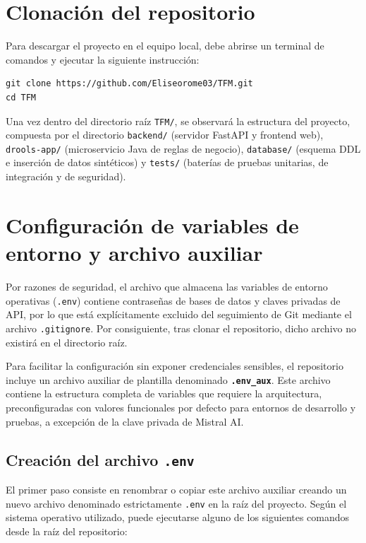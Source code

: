 \section{Clonación del repositorio}

Para descargar el proyecto en el equipo local, debe abrirse un terminal de comandos y ejecutar la siguiente instrucción:

\begin{verbatim}
git clone https://github.com/Eliseorome03/TFM.git
cd TFM
\end{verbatim}

Una vez dentro del directorio raíz \texttt{TFM/}, se observará la estructura del proyecto, compuesta por el directorio \texttt{backend/} (servidor FastAPI y frontend web), \texttt{drools-app/} (microservicio Java de reglas de negocio), \texttt{database/} (esquema DDL e inserción de datos sintéticos) y \texttt{tests/} (baterías de pruebas unitarias, de integración y de seguridad).

\section{Configuración de variables de entorno y archivo auxiliar}

Por razones de seguridad, el archivo que almacena las variables de entorno operativas (\texttt{.env}) contiene contraseñas de bases de datos y claves privadas de API, por lo que está explícitamente excluido del seguimiento de Git mediante el archivo \texttt{.gitignore}. Por consiguiente, tras clonar el repositorio, dicho archivo no existirá en el directorio raíz.

Para facilitar la configuración sin exponer credenciales sensibles, el repositorio incluye un archivo auxiliar de plantilla denominado \textbf{\texttt{.env\_aux}}. Este archivo contiene la estructura completa de variables que requiere la arquitectura, preconfiguradas con valores funcionales por defecto para entornos de desarrollo y pruebas, a excepción de la clave privada de Mistral AI.

\subsection{Creación del archivo \texttt{.env}}

El primer paso consiste en renombrar o copiar este archivo auxiliar creando un nuevo archivo denominado estrictamente \texttt{.env} en la raíz del proyecto. Según el sistema operativo utilizado, puede ejecutarse alguno de los siguientes comandos desde la raíz del repositorio:

